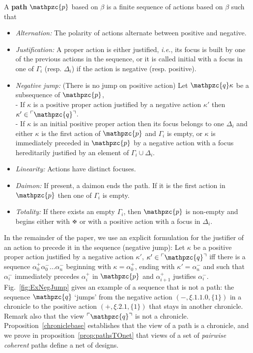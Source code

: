 \documentclass{LMCS}
\def\ie{{\em i.e.}}
\newcommand{\design}[1]{{\mathfrak{#1}}}
\newcommand{\pathLL}[1]{\mathpzc{#1}}\newcommand{\strategy}[1]{\pathLL{#1}}\newcommand{\view}[1]{\raisebox{.3ex}{$\ulcorner$}{#1}\raisebox{.3ex}{$\urcorner$}}\newcommand{\fullview}[1]{\raisebox{.3ex}{$\ulcorner\mkern-6mu\ulcorner\mkern-2mu$}{#1}\raisebox{.3ex}{$\mkern-2mu\urcorner\mkern-6mu\urcorner$}}\newcommand{\views}[1]{\view{#1}}\newcommand{\fullviews}[1]{\fullview{#1}}\newcommand{\shuffle}[1]{\llcorner\design{#1}\lrcorner}\newcommand{\PoD}[1]{{\mathcal{P}}_{#1}}\newcommand{\norm}[1]{\llbracket\design{#1}\rrbracket}
\begin{document}
\begin{defi}[Path]\label{defi:path}
A {\bf path} $\pathLL{p}$ based on $\beta$ is a finite sequence of
actions based on $\beta$ such that
\begin{itemize}
\item {\em Alternation:} The polarity of actions alternate between
positive and negative.
\item {\em Justification:} A proper action is either justified, \ie, its
focus is built by one of the previous actions in the sequence, or it is
called initial with a focus in one of $\Gamma_i$ (resp. $\Delta_i$) if
the action is negative (resp. positive).
\item {\em Negative jump:} (There is no jump on positive action) Let $\pathLL{q}\kappa$ be a subsequence of $\pathLL{p}$,\\
- If  $\kappa$ is a positive proper action justified by a negative
action $\kappa'$ then $\kappa' \in \view{\pathLL{q}}$.\\
- If  $\kappa$ is an initial positive proper action then its focus belongs to
one $\Delta_i$  and either $\kappa$ is  the first action of $\pathLL{p}$
and $\Gamma_i$ is empty, or  $\kappa$ is immediately preceded in
$\pathLL{p}$ by a negative action with a focus hereditarily justified by an element
of $\Gamma_i\cup\Delta_i$.
\item {\em Linearity:} Actions have distinct focuses.
\item {\em Daimon:} If present, a daimon ends the path. If it is the
first action in $\pathLL{p}$ then one of $\Gamma_i$ is empty.
\item {\em Totality:} If there exists an empty $\Gamma_i$, then $\pathLL{p}$ is non-empty and begins either with $\daimon$ or with a positive action with a focus in $\Delta_i$.
\end{itemize}
\end{defi}

\noindent In the remainder of the paper, we use an explicit formulation for the justifier of an action to precede it in the sequence (negative jump): Let $\kappa$ be a positive proper action justified by a negative
action $\kappa'$, 
$\kappa' \in \view{\pathLL{q}}$
iff
there is a sequence
$\alpha_0^+\alpha^-_0\dots\alpha^-_n$  beginning with
$\kappa=\alpha_0^+$, ending with $\kappa'=\alpha_n^-$ and such that
$\alpha^-_i$ immediately precedes $\alpha^+_i$ in $\pathLL{p}$ and
$\alpha_{i+1}^+$ justifies $\alpha_i^-$.
Fig.~\ref{fig:ExNegJump} gives an example of a sequence that is not a path: the sequence $\pathLL{q}$ `jumps' from the negative action $(-,\xi.1.1.0,\{1\})$ in a chronicle to the positive action $(+,\xi.2.1,\{1\})$ that stays in another chronicle.
Remark also that the view $\view{\pathLL{q}}$ is not a chronicle. Proposition~\ref{chroniclebase} establishes that the view of a path is a chronicle, and we prove in proposition~\ref{prop:pathsTOnet} that views of a set of {\em pairwise coherent} paths define a net of designs.
\end{document}
